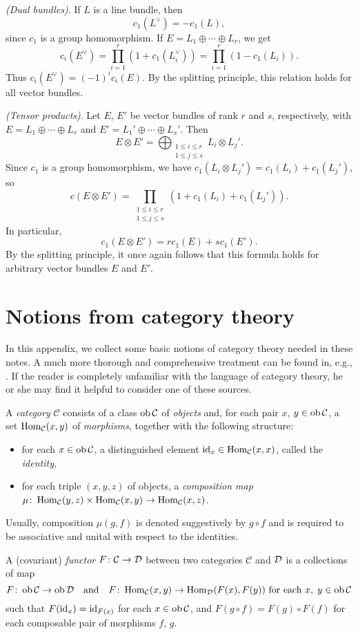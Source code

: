 \documentclass[a4paper,openany]{scrbook}
\renewcommand{\C}{\mathcal C}
\begin{document}
\begin{example}
\textit{(Dual bundles)}. If $L$ is a line bundle, then $$c_1(L^\vee)=-c_1(L),$$
since $c_1$ is a group homomorphism. If $E=L_1\oplus\cdots \oplus L_r$, we get
$$c_i(E^\vee)=\prod_{i=1}^r(1+c_1(L_i^\vee))=\prod_{i=1}^r(1-c_1(L_i)).$$
Thus $c_i(E^\vee)=(-1)^ic_i(E)$. By the splitting principle, this relation holds for all vector bundles.
\end{example}

\begin{example}
\textit{(Tensor products)}. Let $E$, $E'$ be vector bundles of rank $r$ and $s$, respectively, with $E=L_1\oplus\cdots\oplus L_r$ and $E'=L_1'\oplus\cdots\oplus L_s'$. Then
$$E\otimes E'=\bigoplus_{\substack{1\le i\le r\\1\le j\le s}}L_i\otimes L_j'.$$
Since $c_1$ is a group homomorphism, we have $c_1(L_i\otimes L_j')=c_1(L_i)+c_1(L_j')$, so
$$c(E\otimes E')=\prod_{\substack{1\le i\le r\\1\le j\le s}} (1+c_1(L_i)+c_1(L_j')).$$
In particular,
$$c_1(E\otimes E')=rc_1(E)+sc_1(E').$$
By the splitting principle, it once again follows that this formula holds for arbitrary vector bundles $E$ and $E'$.
\end{example}


\appendix

\chapter{Notions from category theory}

In this appendix, we collect some basic notions of category theory needed in these notes. A much more thorough and comprehensive treatment can be found in, e.g., \cite{maclane:cwm,borceux:volone}. If the reader is completely unfamiliar with the language of category theory, he or she may find it helpful to consider one of these sources.

\begin{defn}
A \emph{category} $\C$ consists of a class $\ob \C$ of \emph{objects} and, for each pair $x$, $y \in \ob \C$, a set $\Hom_\C(x,y)$ of \emph{morphisms}, together with the following structure:
\begin{itemize}
\item for each $x \in \ob \C$, a distinguished element $\id_x \in \Hom_\C(x,x)$, called the \emph{identity},
\item for each triple $(x,y,z)$ of objects, a \emph{composition map} $\mu\colon \Hom_\C(y,z) \times \Hom_\C(x,y) \to \Hom_\C(x,z)$.
\end{itemize}
Usually, composition $\mu(g,f)$ is denoted suggestively by $g \circ f$ and is required to be associative and unital with respect to the identities.

A (covariant) \emph{functor} $F\colon \C \to \D$ between two categories $\C$ and $\mathcal D$ is a collections of map
\[
F\colon \ob \C \to \ob \D \quad \text{and} \quad F\colon \Hom_\C(x,y) \to \Hom_\D(F(x),F(y)) \text{ for each } x,\;y \in \ob \C
\]
such that $F(\operatorname{id}_x) = \operatorname{id}_{F(x)}$ for each $x \in \ob \C$, and $F(g \circ f) = F(g) \circ F(f)$ for each composable pair of morphisms $f$, $g$.
\end{defn}
\end{document}

